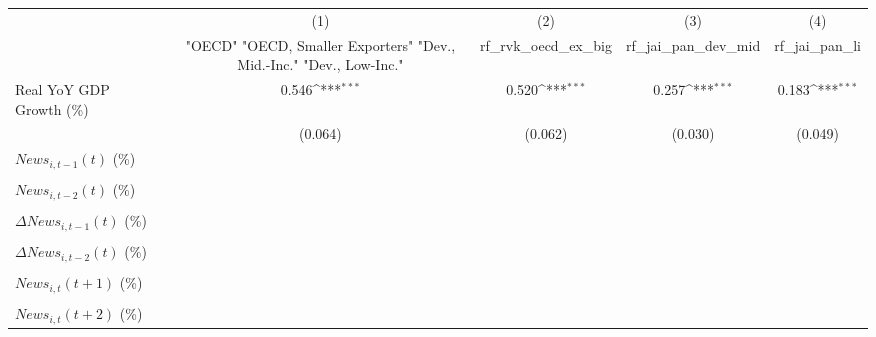 {
\def\sym#1{\ifmmode^{#1}\else\(^{#1}\)\fi}
\begin{tabular}{l*{4}{c}}
\toprule
                    &\multicolumn{1}{c}{(1)}&\multicolumn{1}{c}{(2)}&\multicolumn{1}{c}{(3)}&\multicolumn{1}{c}{(4)}\\
                    &\multicolumn{1}{c}{ "OECD" "OECD, Smaller Exporters" "Dev., Mid.-Inc." "Dev., Low-Inc."}&\multicolumn{1}{c}{rf_rvk_oecd_ex_big}&\multicolumn{1}{c}{rf_jai_pan_dev_mid}&\multicolumn{1}{c}{rf_jai_pan_li}\\
\midrule
Real YoY GDP Growth (\%)&       0.546\sym{***}&       0.520\sym{***}&       0.257\sym{***}&       0.183\sym{***}\\
                    &     (0.064)         &     (0.062)         &     (0.030)         &     (0.049)         \\
\addlinespace
$ News_{i,t-1}(t)$ (\%)&                     &                     &                     &                     \\
                    &                     &                     &                     &                     \\
\addlinespace
$ News_{i,t-2}(t)$ (\%)&                     &                     &                     &                     \\
                    &                     &                     &                     &                     \\
\addlinespace
$ \Delta News_{i,t-1}(t)$ (\%)&                     &                     &                     &                     \\
                    &                     &                     &                     &                     \\
\addlinespace
$ \Delta News_{i,t-2}(t)$ (\%)&                     &                     &                     &                     \\
                    &                     &                     &                     &                     \\
\addlinespace
$ News_{i,t}(t+1)$ (\%)&                     &                     &                     &                     \\
                    &                     &                     &                     &                     \\
\addlinespace
$ News_{i,t}(t+2)$ (\%)&                     &                     &                     &                     \\

\end{tabular}}
